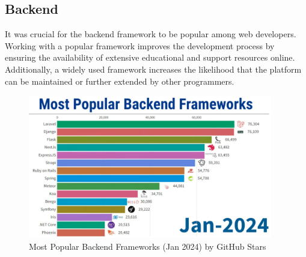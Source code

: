 \subsection{Backend}
\label{subsec:methodology:frameworks:backend}
It was crucial for the backend framework to be popular among web developers. Working with a popular framework improves the development process by ensuring the availability of extensive educational and support resources online. Additionally, a widely used framework increases the likelihood that the platform can be maintained or further extended by other programmers.

\begin{figure}[htbp]
 \centering
 \includegraphics[width=0.95\textwidth]{gfx/figures/Popular_BE.png}
 \caption{Most Popular Backend Frameworks (Jan 2024) by GitHub Stars \cite{backend:popularity}}
 \label{fig:methodology:popularBE}
\end{figure}

